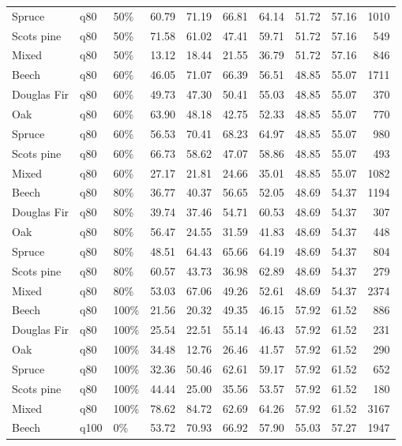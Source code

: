 \begin{longtable}{lllrrrrrrr}
  Spruce & q80 & 50\% & 60.79 & 71.19 & 66.81 & 64.14 & 51.72 & 57.16 & 1010 \\ 
  Scots pine & q80 & 50\% & 71.58 & 61.02 & 47.41 & 59.71 & 51.72 & 57.16 & 549 \\ 
  Mixed & q80 & 50\% & 13.12 & 18.44 & 21.55 & 36.79 & 51.72 & 57.16 & 846 \\ 
  Beech & q80 & 60\% & 46.05 & 71.07 & 66.39 & 56.51 & 48.85 & 55.07 & 1711 \\ 
  Douglas Fir & q80 & 60\% & 49.73 & 47.30 & 50.41 & 55.03 & 48.85 & 55.07 & 370 \\ 
  Oak & q80 & 60\% & 63.90 & 48.18 & 42.75 & 52.33 & 48.85 & 55.07 & 770 \\ 
  Spruce & q80 & 60\% & 56.53 & 70.41 & 68.23 & 64.97 & 48.85 & 55.07 & 980 \\ 
  Scots pine & q80 & 60\% & 66.73 & 58.62 & 47.07 & 58.86 & 48.85 & 55.07 & 493 \\ 
  Mixed & q80 & 60\% & 27.17 & 21.81 & 24.66 & 35.01 & 48.85 & 55.07 & 1082 \\ 
  Beech & q80 & 80\% & 36.77 & 40.37 & 56.65 & 52.05 & 48.69 & 54.37 & 1194 \\ 
  Douglas Fir & q80 & 80\% & 39.74 & 37.46 & 54.71 & 60.53 & 48.69 & 54.37 & 307 \\ 
  Oak & q80 & 80\% & 56.47 & 24.55 & 31.59 & 41.83 & 48.69 & 54.37 & 448 \\ 
  Spruce & q80 & 80\% & 48.51 & 64.43 & 65.66 & 64.19 & 48.69 & 54.37 & 804 \\ 
  Scots pine & q80 & 80\% & 60.57 & 43.73 & 36.98 & 62.89 & 48.69 & 54.37 & 279 \\ 
  Mixed & q80 & 80\% & 53.03 & 67.06 & 49.26 & 52.61 & 48.69 & 54.37 & 2374 \\ 
  Beech & q80 & 100\% & 21.56 & 20.32 & 49.35 & 46.15 & 57.92 & 61.52 & 886 \\ 
  Douglas Fir & q80 & 100\% & 25.54 & 22.51 & 55.14 & 46.43 & 57.92 & 61.52 & 231 \\ 
  Oak & q80 & 100\% & 34.48 & 12.76 & 26.46 & 41.57 & 57.92 & 61.52 & 290 \\ 
  Spruce & q80 & 100\% & 32.36 & 50.46 & 62.61 & 59.17 & 57.92 & 61.52 & 652 \\ 
  Scots pine & q80 & 100\% & 44.44 & 25.00 & 35.56 & 53.57 & 57.92 & 61.52 & 180 \\ 
  Mixed & q80 & 100\% & 78.62 & 84.72 & 62.69 & 64.26 & 57.92 & 61.52 & 3167 \\ 
  Beech & q100 & 0\% & 53.72 & 70.93 & 66.92 & 57.90 & 55.03 & 57.27 & 1947 \\ 

\end{longtable}
